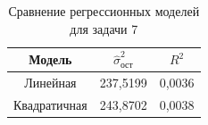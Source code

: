 \begin{table}[H]
\centering
\caption{Сравнение регрессионных моделей для задачи 7}
\small
\begin{tabular}{ccc}
\toprule
Модель & $\hat\sigma^2_{\text{ост}}$ & $R^2$ \\
\midrule
Линейная & 237,5199 & 0,0036 \\
Квадратичная & 243,8702 & 0,0038 \\
\bottomrule
\end{tabular}
\end{table}
